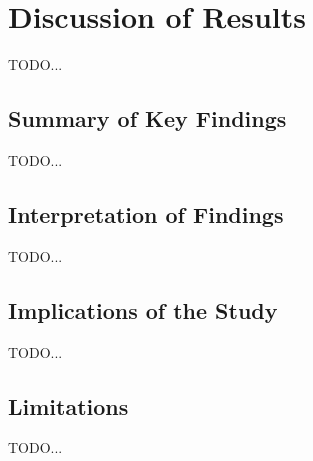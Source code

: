 \chapter{Discussion of Results}
\label{sec:Results}
\label{Chapter4} %

TODO...

\section{Summary of Key Findings}
TODO...

\section{Interpretation of Findings}
TODO...

\section{Implications of the Study}
TODO...

\section{Limitations}
TODO...

